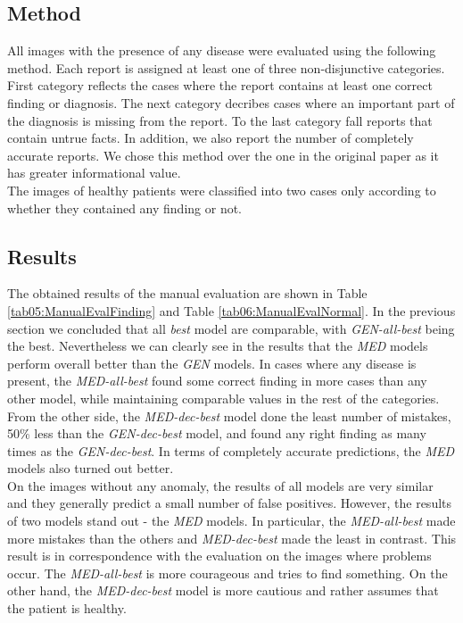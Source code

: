 \subsection{Method}
All images with the presence of any disease were evaluated using the following method. Each report is assigned at least one of three non-disjunctive categories. First category reflects the cases where the report contains at least one correct finding or diagnosis. The next category decribes cases where an important part of the diagnosis is missing from the report. To the last category fall reports that contain untrue facts. In addition, we also report the number of completely accurate reports. We chose this method over the one in the original paper as it has greater informational value.\\

The images of healthy patients were classified into two cases only according to whether they contained any finding or not.

\subsection{Results}
The obtained results of the manual evaluation are shown in Table \ref{tab05:ManualEvalFinding} and Table \ref{tab06:ManualEvalNormal}. In the previous section we concluded that all \textit{best} model are comparable, with \textit{GEN-all-best} being the best. Nevertheless we can clearly see in the results that the  \textit{MED} models perform overall better than the \textit{GEN} models. In cases where any disease is present, the \textit{MED-all-best} found some correct finding in more cases than any other model, while maintaining comparable values in the rest of the categories. From the other side, the \textit{MED-dec-best} model done the least number of mistakes, 50\% less than the \textit{GEN-dec-best} model, and found any right finding as many times as the \textit{GEN-dec-best}. In terms of completely accurate predictions, the \textit{MED} models also turned out better.\\

On the images without any anomaly, the results of all models are very similar and they generally predict a small number of false positives. However, the results of two models stand out - the \textit{MED} models. In particular, the \textit{MED-all-best} made more mistakes than the others and \textit{MED-dec-best} made the least in contrast. This result is in correspondence with the evaluation on the images where problems occur. The \textit{MED-all-best} is more courageous and tries to find something. On the other hand, the \textit{MED-dec-best} model is more cautious and rather assumes that the patient is healthy.

